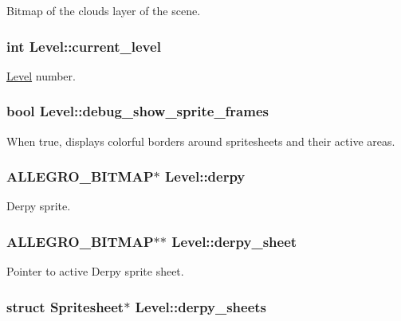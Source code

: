 \-Bitmap of the clouds layer of the scene. \hypertarget{structLevel_a1ba3ee0104c912dde5d6e70fee889512}{
\subsubsection[{current\-\_\-level}]{\setlength{\rightskip}{0pt plus 5cm}int {\bf \-Level\-::current\-\_\-level}}}\label{structLevel_a1ba3ee0104c912dde5d6e70fee889512}
\hyperlink{structLevel}{\-Level} number. \hypertarget{structLevel_a1df786b74cff642434ea6587e6141b4d}{
\subsubsection[{debug\-\_\-show\-\_\-sprite\-\_\-frames}]{\setlength{\rightskip}{0pt plus 5cm}bool {\bf \-Level\-::debug\-\_\-show\-\_\-sprite\-\_\-frames}}}\label{structLevel_a1df786b74cff642434ea6587e6141b4d}
\-When true, displays colorful borders around spritesheets and their active areas. \hypertarget{structLevel_ae33832497116b7a0c184959bbde21ee5}{
\subsubsection[{derpy}]{\setlength{\rightskip}{0pt plus 5cm}\-A\-L\-L\-E\-G\-R\-O\-\_\-\-B\-I\-T\-M\-A\-P$\ast$ {\bf \-Level\-::derpy}}}\label{structLevel_ae33832497116b7a0c184959bbde21ee5}
\-Derpy sprite. \hypertarget{structLevel_a0e02f3a5674a2ad3c23de22b6a4ed044}{
\subsubsection[{derpy\-\_\-sheet}]{\setlength{\rightskip}{0pt plus 5cm}\-A\-L\-L\-E\-G\-R\-O\-\_\-\-B\-I\-T\-M\-A\-P$\ast$$\ast$ {\bf \-Level\-::derpy\-\_\-sheet}}}\label{structLevel_a0e02f3a5674a2ad3c23de22b6a4ed044}
\-Pointer to active \-Derpy sprite sheet. \hypertarget{structLevel_aad19c0af5ac43ceb72df311d89bd4297}{
\subsubsection[{derpy\-\_\-sheets}]{\setlength{\rightskip}{0pt plus 5cm}struct {\bf \-Spritesheet}$\ast$ {\bf \-Level\-::derpy\-\_\-sheets}}}\label{structLevel_aad19c0af5ac43ceb72df311d89bd4297}
